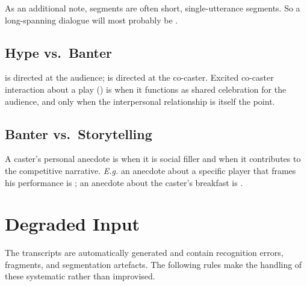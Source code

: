 \noindent As an additional note, \HYP{} segments are often short, single-utterance segments. So a long-spanning dialogue will most probably be \PBP{}.

\subsection{Hype vs.\ Banter}
\label{sec:b-ban-hyp}

\begin{agrulebox}
 \HYP{} is directed at the audience; \BAN{} is directed at the co-caster. Excited co-caster interaction about a play () is \HYP{} when it functions as shared celebration for the audience, and \BAN{} only when the interpersonal relationship is itself the point.
\end{agrulebox}

\subsection{Banter vs.\ Storytelling}
\label{sec:b-ban-sto}

\begin{agrulebox}
 A caster's personal anecdote is \BAN{} when it is social filler and \STO{} when it contributes to the competitive narrative. \textit{E.g.} an anecdote about a specific player that frames his performance is \STO{}; an anecdote about the caster's breakfast is \BAN{}.
\end{agrulebox}

\section{Degraded Input}
\label{sec:degraded}

The transcripts are automatically generated and contain recognition errors, fragments, and segmentation artefacts. The following rules make the handling of these systematic rather than improvised.

